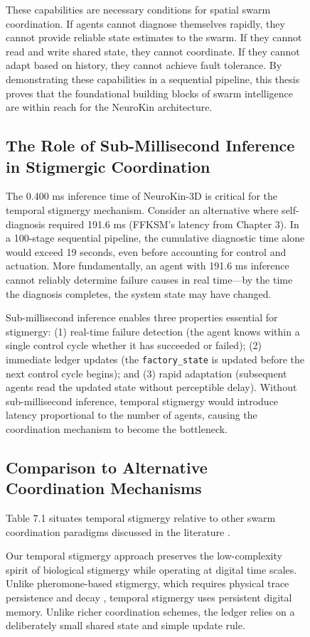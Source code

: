 \documentclass[12pt,a4paper,oneside]{report}
\begin{document}
\begin{figure}[H]
These capabilities are necessary conditions for spatial swarm coordination. If agents cannot diagnose themselves rapidly, they cannot provide reliable state estimates to the swarm. If they cannot read and write shared state, they cannot coordinate. If they cannot adapt based on history, they cannot achieve fault tolerance. By demonstrating these capabilities in a sequential pipeline, this thesis proves that the foundational building blocks of swarm intelligence are within reach for the NeuroKin architecture.

\subsection{The Role of Sub-Millisecond Inference in Stigmergic Coordination}

The 0.400 ms inference time of NeuroKin-3D is critical for the temporal stigmergy mechanism. Consider an alternative where self-diagnosis required 191.6 ms (FFKSM's latency from Chapter 3). In a 100-stage sequential pipeline, the cumulative diagnostic time alone would exceed 19 seconds, even before accounting for control and actuation. More fundamentally, an agent with 191.6 ms inference cannot reliably determine failure causes in real time---by the time the diagnosis completes, the system state may have changed.

Sub-millisecond inference enables three properties essential for stigmergy: (1) real-time failure detection (the agent knows within a single control cycle whether it has succeeded or failed); (2) immediate ledger updates (the \texttt{factory\_state} is updated before the next control cycle begins); and (3) rapid adaptation (subsequent agents read the updated state without perceptible delay). Without sub-millisecond inference, temporal stigmergy would introduce latency proportional to the number of agents, causing the coordination mechanism to become the bottleneck.

\subsection{Comparison to Alternative Coordination Mechanisms}

Table 7.1 situates temporal stigmergy relative to other swarm coordination paradigms discussed in the literature \cite{bongard2006resilient, cully2015robots, domberg2026selfadapting}.

Our temporal stigmergy approach preserves the low-complexity spirit of biological stigmergy while operating at digital time scales. Unlike pheromone-based stigmergy, which requires physical trace persistence and decay \cite{bongard2006resilient}, temporal stigmergy uses persistent digital memory. Unlike richer coordination schemes, the ledger relies on a deliberately small shared state and simple update rule.


\end{figure}
\end{document}
